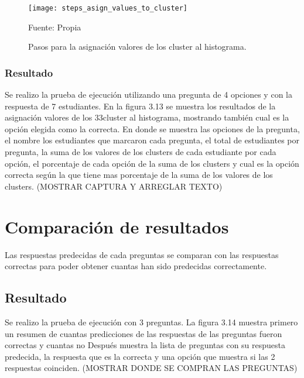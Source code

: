 \begin{figure}[ht]
	\begin{center}
		\texttt{[image: steps\_asign\_values\_to\_cluster]}
	\end{center}
	\begin{center}
		\vskip -0.5cm
		\caption{\small{Pasos para la asignación valores de los cluster al histograma.}}
		{\small{Fuente: Propia}}
	\end{center}
\end{figure}

\subsubsection{Resultado}

Se realizo la prueba de ejecución utilizando una pregunta de 4 opciones y con la respuesta de 7 estudiantes. En la figura 3.13 se muestra los resultados de la asignación valores de los 33cluster al histograma, mostrando también cual es la opción elegida como la correcta. En donde se muestra las opciones de la pregunta, el nombre los estudiantes que marcaron cada pregunta,
el total de estudiantes por pregunta, la suma de los valores de los clusters de cada estudiante por cada opción, el porcentaje de cada opción de la suma de los clusters y cual es la opción correcta según la que tiene mas porcentaje de la suma de los valores de los clusters. (MOSTRAR CAPTURA Y ARREGLAR TEXTO)


\section{Comparación de resultados} 

Las respuestas predecidas de cada preguntas se comparan con las respuestas correctas para poder obtener cuantas han sido predecidas correctamente.

\subsection{Resultado}

Se realizo la prueba de ejecución con 3 preguntas. La figura 3.14 muestra primero un resumen de cuantas predicciones de las respuestas de las preguntas fueron correctas y cuantas no Después muestra la lista de preguntas con su respuesta predecida, la respuesta que es la correcta y una opción que muestra si las 2 respuestas coinciden.
(MOSTRAR DONDE SE COMPRAN LAS PREGUNTAS)





















